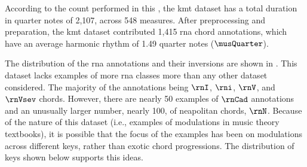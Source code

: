 
According to the count performed in this \thesisdiss{}, the
\gls{kmt} dataset has a total duration in quarter notes of
2,107, across 548 measures. After preprocessing and
preparation, the \gls{kmt} dataset contributed 1,415
\gls{rna} chord annotations, which have an average harmonic
rhythm of 1.49 quarter notes ($\musQuarter$).

The distribution of the \gls{rna} annotations and their
inversions are shown in . This
dataset lacks examples of more \gls{rna} classes more than
any other dataset considered. The majority of the
annotations being $\rnI$, $\rni$, $\rnV$, and $\rnVsev$
chords. However, there are nearly 50 examples of $\rnCad$
annotations and an unusually larger number, nearly 100, of
\gls{neapolitan} chords, $\rnN$. Because of the nature of
this dataset (i.e., examples of modulations in music theory
textbooks), it is possible that the focus of the examples
has been on modulations across different keys, rather than
exotic chord progressions. The distribution of keys shown
below supports this ideas.




